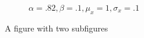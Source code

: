\documentclass[11pt]{article}
\theoremstyle{definition}
\begin{document}
\begin{figure}[h!]
\begin{subfigure}{.5\textwidth}
      \caption{$\alpha = .82, \beta = .1, \mu_{x} = 1, \sigma_{x} = .1$}
      \label{fig:dual_shock_strong_alpha_inside}
    \end{subfigure}
    \caption{A figure with two subfigures}
    \label{fig:not_sure_what_write}
    \end{figure}

\end{document}
